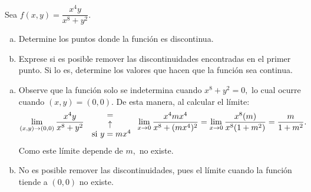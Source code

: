 \begin{prob}
Sea $f(x,y)=\dfrac{x^4y}{x^8+y^2}.$
\begin{enumerate}[(a)]
    \item Determine los puntos donde la función es discontinua.
    \item Exprese si es posible remover las discontinuidades encontradas en el primer punto. Si lo es, determine los valores que hacen que la función sea continua. 
\end{enumerate}
\begin{myproof}
\begin{enumerate}[(a)]
\item Observe que la función solo se indetermina cuando $x^8+y^2=0,$ lo cual ocurre cuando $(x,y)=(0,0).$ De esta manera, al calcular el límite:
 \begin{align*}
\displaystyle\lim_{(x,y)\to (0,0)} \dfrac{x^4y}{x^8+y^2} {{=}\atop {\begin{array}{c}
\uparrow\\ \text{ si $y=mx^4$}\end{array}} } \displaystyle\lim_{x\to 0}\dfrac{x^4mx^4}{x^8+(mx^4)^2}=\displaystyle\lim_{x\to 0}\dfrac{x^8(m)}{x^8(1+m^2)}=\displaystyle\dfrac{m}{1+m^2}.
\end{align*}
Como este límite depende de $m,$ no existe.
\item No es posible remover las discontinuidades, pues el límite cuando la función tiende a $(0,0)$ no existe.
\end{enumerate}
\end{myproof}
\end{prob}

